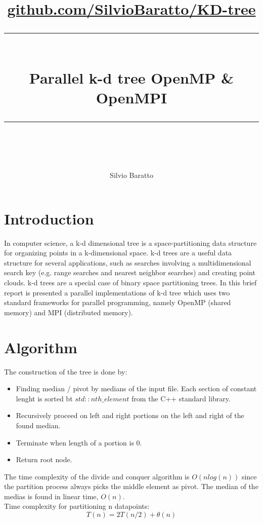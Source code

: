 \documentclass[11pt,a4paper]{article}
\begin{document}
\newcommand{\horrule}[1]{\rule{\linewidth}{#1}}
\lstset{language=Java} 
\lstset{basicstyle=\footnotesize\ttfamily}
\author{Silvio Baratto}
\title{
\normalfont \normalsize 
\href{https://github.com/SilvioBaratto/KD-tree}{github.com/SilvioBaratto/KD-tree} \\ [25pt] %
\horrule{0.5pt} \\[0.4cm] %
\huge Parallel k-d tree OpenMP \& OpenMPI\\ %
\horrule{2pt} \\[0.5cm] %
}
\maketitle
\tableofcontents
\newpage
\section{Introduction}
In computer science, a k-d dimensional tree is a space-partitioning data structure for organizing points in a k-dimensional space. k-d trees are a useful data structure for several applications, such as searches involving a multidimensional search key (e.g. range searches and nearest neighbor searches) and creating point clouds. k-d trees are a special case of binary space partitioning trees. In this brief report is presented a parallel implementations of k-d tree which uses two standard frameworks for parallel programming, namely OpenMP (shared memory) and MPI (distributed memory).
\section{Algorithm}
The construction of the tree is done by:
\begin{center}
\begin{itemize}
\item Finding median / pivot by medians of the input file. Each section of constant lenght is sorted bt $std::nth\_element$ from the C++ standard library. \\
\item Recursively proceed on left and right portions on the left and right of the found median.  \\
\item Terminate when length of a portion is 0. \\
\item Return root node.
\end{itemize}
\end{center}
The time complexity of the divide and conquer algorithm is $O(nlog(n))$ since the partition process always picks the middle element as pivot. The median of the medias is found in linear time, $O(n)$.\\
Time complexity for partitioning n datapoints:
\begin{equation*}
T(n) = 2T(n / 2)+ \theta{(n)}
\end{equation*}
\end{document}
